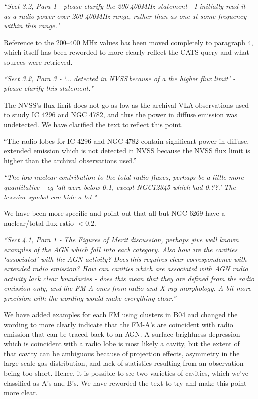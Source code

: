 \documentclass[11pt]{article}
\begin{document}
\hrulefill

{\it{``Sect 3.2, Para 1 - please clarify the 200-400MHz statement - I
    initially read it as a radio power over 200-400MHz range, rather
    than as one at some frequency within this range."}}

Reference to the 200--400 MHz values has been moved completely to
paragraph 4, which itself has been reworded to more clearly reflect
the CATS query and what sources were retrieved.

\hrulefill

{\it{``Sect 3.2, Para 3 - `... detected in NVSS because of a the
    higher flux limit' - please clarify this statement."}}

The NVSS's flux limit does not go as low as the archival VLA
observations used to study IC 4296 and NGC 4782, and thus the power in
diffuse emission was undetected. We have clarified the text to reflect
this point.

``The radio lobes for IC 4296 and NGC 4782 contain significant power
in diffuse, extended emission which is not detected in NVSS because
the NVSS flux limit is higher than the archival observations used.''

\hrulefill

{\it{``The low nuclear contribution to the total radio fluxes, perhaps
    be a little more quantitative - eg `all were below 0.1, except
    NGC12345 which had 0.??.' The lesssim symbol can hide a lot."}}

We have been more specific and point out that all but NGC 6269 have a
nuclear/total flux ratio $< 0.2$.

\hrulefill

{\it{``Sect 4.1, Para 1 - The Figures of Merit discussion, perhaps give
    well known examples of the AGN which fall into each category.
    Also how are the cavities `associated' with the AGN activity?
    Does this requires clear correspondence with extended radio
    emission?  How can cavities which are associated with AGN radio
    activity lack clear boundaries - does this mean that they are
    defined from the radio emission only, and the FM-A ones from radio
    and X-ray morphology. A bit more precision with the wording would
    make everything clear.''}}

We have added examples for each FM using clusters in B04 and changed
the wording to more clearly indicate that the FM-A's are coincident
with radio emission that can be traced back to an AGN. A surface
brightness depression which is coincident with a radio lobe is most
likely a cavity, but the extent of that cavity can be ambiguous
because of projection effects, asymmetry in the large-scale gas
distribution, and lack of statistics resulting from an observation
being too short. Hence, it is possible to see two varieties of
cavities, which we've classified as A's and B's. We have reworded the
text to try and make this point more clear.
\end{document}

